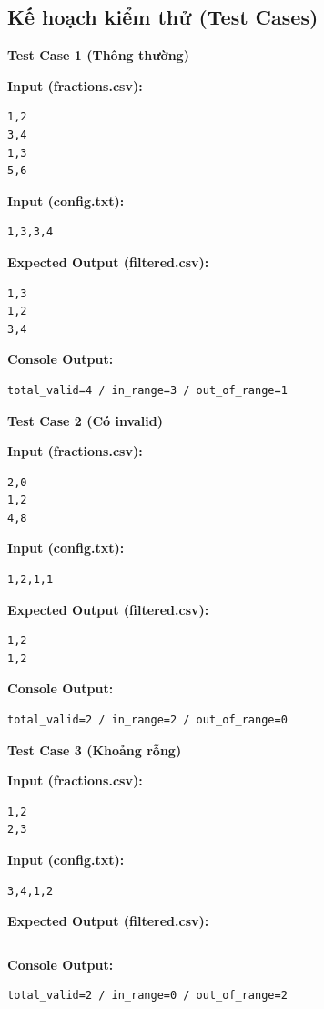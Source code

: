 \subsection{Kế hoạch kiểm thử (Test Cases)}

\textbf{Test Case 1 (Thông thường)}

\textbf{Input (fractions.csv):}
\begin{lstlisting}
1,2
3,4
1,3
5,6
\end{lstlisting}

\textbf{Input (config.txt):}
\begin{lstlisting}
1,3,3,4
\end{lstlisting}

\textbf{Expected Output (filtered.csv):}
\begin{lstlisting}
1,3
1,2
3,4
\end{lstlisting}

\textbf{Console Output:}
\begin{lstlisting}
total_valid=4 / in_range=3 / out_of_range=1
\end{lstlisting}

\vspace{0.5cm}

\textbf{Test Case 2 (Có invalid)}

\textbf{Input (fractions.csv):}
\begin{lstlisting}
2,0
1,2
4,8
\end{lstlisting}

\textbf{Input (config.txt):}
\begin{lstlisting}
1,2,1,1
\end{lstlisting}

\textbf{Expected Output (filtered.csv):}
\begin{lstlisting}
1,2
1,2
\end{lstlisting}

\textbf{Console Output:}
\begin{lstlisting}
total_valid=2 / in_range=2 / out_of_range=0
\end{lstlisting}

\vspace{0.5cm}

\textbf{Test Case 3 (Khoảng rỗng)}

\textbf{Input (fractions.csv):}
\begin{lstlisting}
1,2
2,3
\end{lstlisting}

\textbf{Input (config.txt):}
\begin{lstlisting}
3,4,1,2
\end{lstlisting}

\textbf{Expected Output (filtered.csv):}
\begin{lstlisting}

\end{lstlisting}

\textbf{Console Output:}
\begin{lstlisting}
total_valid=2 / in_range=0 / out_of_range=2
\end{lstlisting}